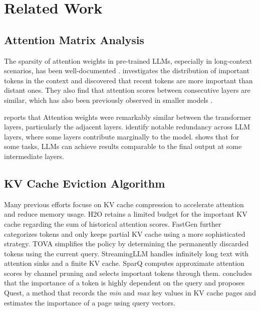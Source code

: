\section{Related Work}
\subsection{Attention Matrix Analysis}
The sparsity of attention weights in pre-trained LLMs,  especially in long-context scenarios,  has been well-documented \citep{liu2022dynamic,  ribar2023sparq, liu2023deja,  xiao2023efficient}. 
\citet{ma2024compressing} investigates the distribution of important tokens in the context and discovered that recent tokens are more important than distant ones. They also find that attention scores between consecutive layers are similar, which has also been previously observed in smaller models \citep{xiao2019sharing,  bhojanapalli2021leveraging}. 


\citet{mu2024cross} reports that Attention weights were remarkably similar between the transformer layers,  particularly the adjacent layers. \citet{men2024shortgpt} identify notable redundancy across LLM layers,  where some layers contribute marginally to the model.  \citet{fan2024not} shows that for some tasks,  LLMs can achieve results comparable to the final output at some intermediate layers. 



\subsection{KV Cache Eviction Algorithm}

Many previous efforts focuse on KV cache compression to accelerate attention and reduce memory usage. H2O \citep{zhang2023h2o} retains a limited budget for the important KV cache regarding the sum of historical attention scores. FastGen \citep{ge2023model} further categorizes tokens and only keeps partial KV cache using a more sophisticated strategy. TOVA \citep{oren2024transformers} simplifies the policy by determining the permanently discarded tokens using the current query. StreamingLLM \citep{xiao2023efficient} handles infinitely long text with attention sinks and a finite KV cache. SparQ \citep{ribar2023sparq} computes approximate attention scores by channel pruning and selects important tokens through them. \citep{tang2024quest} concludes that the importance of a token is highly dependent on the query and proposes Quest, a method that records the \textit{min} and \textit{max} key values in KV cache pages and estimates the importance of a page using query vectors. 


